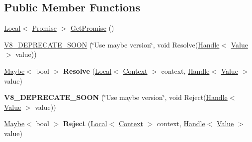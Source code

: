 \subsection*{Public Member Functions}
\begin{DoxyCompactItemize}
\item 
\hyperlink{classv8_1_1_local}{Local}$<$ \hyperlink{classv8_1_1_promise}{Promise} $>$ \hyperlink{classv8_1_1_promise_1_1_resolver_a41fd1ffef546a62e363a639935fc8ae3}{Get\+Promise} ()
\item 
\hyperlink{classv8_1_1_promise_1_1_resolver_a5226239f628fe7e1d9055bc6263a0d68}{V8\+\_\+\+D\+E\+P\+R\+E\+C\+A\+T\+E\+\_\+\+S\+O\+O\+N} (\char`\"{}Use maybe version\char`\"{}, void Resolve(\hyperlink{classv8_1_1_local}{Handle}$<$ \hyperlink{classv8_1_1_value}{Value} $>$ value))
\item 
\hypertarget{classv8_1_1_promise_1_1_resolver_a3a37ad74ea0a3483f163f11681bf5235}{}\hyperlink{classv8_1_1_maybe}{Maybe}$<$ bool $>$ {\bfseries Resolve} (\hyperlink{classv8_1_1_local}{Local}$<$ \hyperlink{classv8_1_1_context}{Context} $>$ context, \hyperlink{classv8_1_1_local}{Handle}$<$ \hyperlink{classv8_1_1_value}{Value} $>$ value)\label{classv8_1_1_promise_1_1_resolver_a3a37ad74ea0a3483f163f11681bf5235}

\item 
\hypertarget{classv8_1_1_promise_1_1_resolver_ac455202a90f4d070ab69bb16c26903b0}{}{\bfseries V8\+\_\+\+D\+E\+P\+R\+E\+C\+A\+T\+E\+\_\+\+S\+O\+O\+N} (\char`\"{}Use maybe version\char`\"{}, void Reject(\hyperlink{classv8_1_1_local}{Handle}$<$ \hyperlink{classv8_1_1_value}{Value} $>$ value))\label{classv8_1_1_promise_1_1_resolver_ac455202a90f4d070ab69bb16c26903b0}

\item 
\hypertarget{classv8_1_1_promise_1_1_resolver_a0121fd37912bfe5f00dfa2cba201412e}{}\hyperlink{classv8_1_1_maybe}{Maybe}$<$ bool $>$ {\bfseries Reject} (\hyperlink{classv8_1_1_local}{Local}$<$ \hyperlink{classv8_1_1_context}{Context} $>$ context, \hyperlink{classv8_1_1_local}{Handle}$<$ \hyperlink{classv8_1_1_value}{Value} $>$ value)\label{classv8_1_1_promise_1_1_resolver_a0121fd37912bfe5f00dfa2cba201412e}

\end{DoxyCompactItemize}
